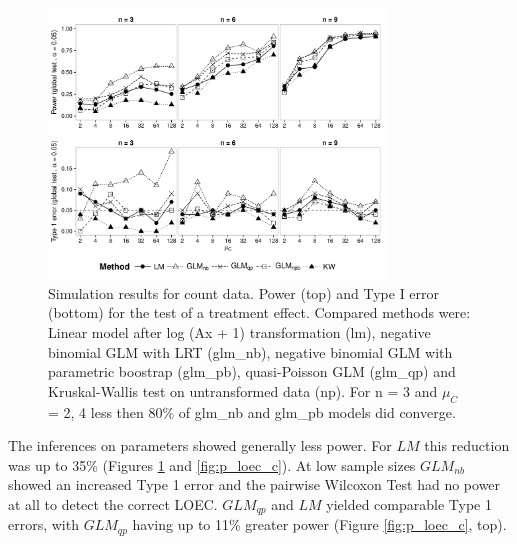 \documentclass{scrartcl}
\begin{document}
\begin{figure}[h]
  \centering
  \includegraphics[width = 0.8\textwidth]{p_glob_c.pdf}
  \caption{Simulation results for count data. Power (top) and Type I error (bottom) for the test of a treatment effect. Compared methods were: Linear model after log (Ax + 1) transformation (lm), negative binomial GLM with LRT (glm\_nb), negative binomial GLM with parametric boostrap (glm\_pb), quasi-Poisson GLM (glm\_qp) and Kruskal-Wallis test on untransformed data (np).
  For n = 3 and $\mu_C$ = {2, 4} less then 80\% of glm\_nb and glm\_pb models did converge.}
  \label{fig:p_glob_c}
\end{figure}

The inferences on parameters showed generally less power.
For $LM$ this reduction was up to 35\% (Figures \ref{fig:p_glob_c} and \ref{fig:p_loec_c}).
At low sample sizes $GLM_{nb}$ showed an increased Type 1 error and the pairwise Wilcoxon Test had no power at all to detect the correct LOEC.
$GLM_{qp}$ and $LM$ yielded comparable Type 1 errors, with $GLM_{qp}$ having up to 11\% greater power (Figure \ref{fig:p_loec_c}, top).
\end{document}
